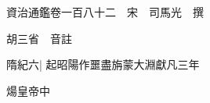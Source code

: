 






























































資治通鑑卷一百八十二　宋　司馬光　撰

胡三省　音註

隋紀六|{
	起昭陽作噩盡旃蒙大淵獻凡三年}


煬皇帝中

